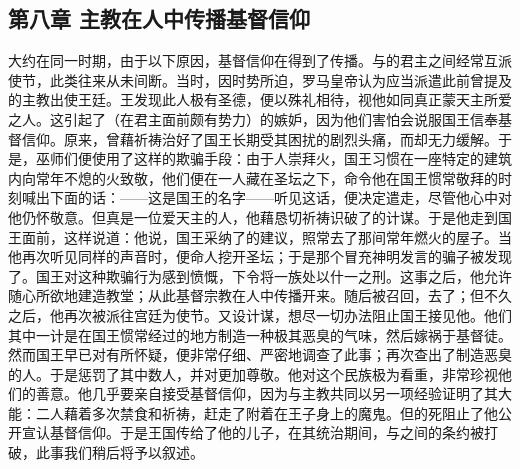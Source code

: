 
\subsection{第八章 主教在人中传播基督信仰}

大约在同一时期，由于以下原因，基督信仰在得到了传播。与的君主之间经常互派使节，此类往来从未间断。当时，因时势所迫，罗马皇帝认为应当派遣此前曾提及的主教出使王廷。王发现此人极有圣德，便以殊礼相待，视他如同真正蒙天主所爱之人。这引起了（在君主面前颇有势力）的嫉妒，因为他们害怕会说服国王信奉基督信仰。原来，曾藉祈祷治好了国王长期受其困扰的剧烈头痛，而却无力缓解。于是，巫师们便使用了这样的欺骗手段：由于人崇拜火，国王习惯在一座特定的建筑内向常年不熄的火致敬，他们便在一人藏在圣坛之下，命令他在国王惯常敬拜的时刻喊出下面的话：——这是国王的名字——听见这话，便决定遣走，尽管他心中对他仍怀敬意。但真是一位爱天主的人，他藉恳切祈祷识破了的计谋。于是他走到国王面前，这样说道：他说，国王采纳了的建议，照常去了那间常年燃火的屋子。当他再次听见同样的声音时，便命人挖开圣坛；于是那个冒充神明发言的骗子被发现了。国王对这种欺骗行为感到愤慨，下令将一族处以什一之刑。这事之后，他允许随心所欲地建造教堂；从此基督宗教在人中传播开来。随后被召回，去了；但不久之后，他再次被派往宫廷为使节。又设计谋，想尽一切办法阻止国王接见他。他们其中一计是在国王惯常经过的地方制造一种极其恶臭的气味，然后嫁祸于基督徒。然而国王早已对有所怀疑，便非常仔细、严密地调查了此事；再次查出了制造恶臭的人。于是惩罚了其中数人，并对更加尊敬。他对这个民族极为看重，非常珍视他们的善意。他几乎要亲自接受基督信仰，因为与主教共同以另一项经验证明了其大能：二人藉着多次禁食和祈祷，赶走了附着在王子身上的魔鬼。但的死阻止了他公开宣认基督信仰。于是王国传给了他的儿子，在其统治期间，与之间的条约被打破，此事我们稍后将予以叙述。\par


